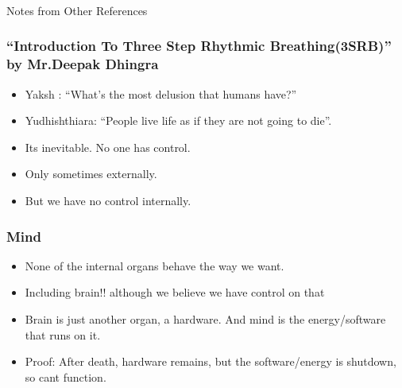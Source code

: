 \begin{frame}[fragile]
\begin{columns}[T]
\begin{column}{.48\textwidth}
\begin{center}
\end{center}

\end{column}%
\end{columns}
\end{frame}

\begin{frame}[fragile]\frametitle{}
\begin{center}
{\Large Notes from Other References}
\end{center}
\end{frame}


\begin{frame}[fragile]
\frametitle{``Introduction To Three Step Rhythmic Breathing(3SRB)'' by Mr.Deepak Dhingra}


\begin{itemize}
\item Yaksh : ``What's the most delusion that humans have?''
\item Yudhishthiara: ``People live life as if they are not going to die''.
\item Its inevitable. No one has control. 
\item Only sometimes externally.
\item But we have no control internally. 
\end{itemize}
\end{frame}


\begin{frame}[fragile]
\frametitle{Mind}
\begin{itemize}
\item None of the internal organs behave the way we want. 
\item Including brain!! although we believe we have control on that
\item Brain is just another organ, a hardware. And mind is the energy/software that runs on it.
\item Proof: After death, hardware remains, but the software/energy is shutdown, so cant function.
\end{itemize}
\end{frame}



